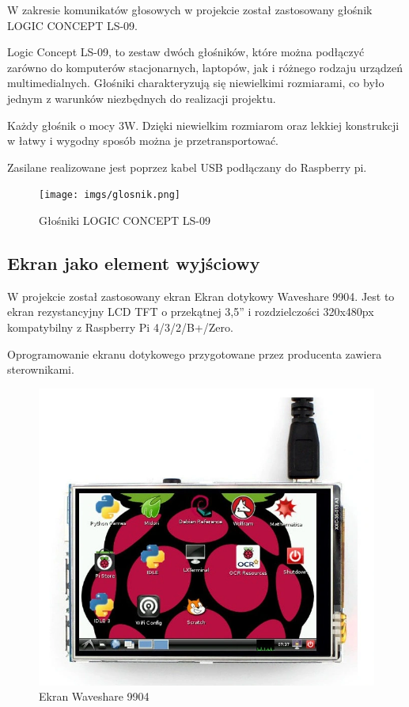 \documentclass[a4paper,12pt,reqno]{article}
\begin{document}
W zakresie komunikatów głosowych w projekcie został zastosowany głośnik LOGIC CONCEPT LS-09.

Logic Concept LS-09, to zestaw dwóch głośników, które można podłączyć zarówno do komputerów stacjonarnych, laptopów, jak i różnego rodzaju urządzeń multimedialnych. Głośniki charakteryzują się niewielkimi rozmiarami, co było jednym z warunków niezbędnych do realizacji projektu.

Każdy głośnik o mocy 3W. Dzięki niewielkim rozmiarom oraz lekkiej konstrukcji w łatwy i wygodny sposób można je przetransportować.

Zasilane realizowane jest poprzez kabel USB podłączany do Raspberry pi.

\begin{figure}[H]%
\centering
\texttt{[image: imgs/glosnik.png]}
\caption{Głośniki LOGIC CONCEPT LS-09 \cite{img_by_me} \label{glosnik}}
\quad
\end{figure}

\subsection{Ekran jako element wyjściowy}

W projekcie został zastosowany ekran Ekran dotykowy Waveshare 9904. Jest to ekran rezystancyjny LCD TFT o przekątnej 3,5'' i rozdzielczości 320x480px kompatybilny z Raspberry Pi 4/3/2/B+/Zero.

Oprogramowanie ekranu dotykowego przygotowane przez producenta zawiera sterownikami.

\begin{figure}[H]%
\centering
\includegraphics[width=0.8\columnwidth]{imgs/ekran.png}
\caption{Ekran Waveshare 9904 \cite{img_screen} \label{ekran}}
\quad
\end{figure}
\end{document}
